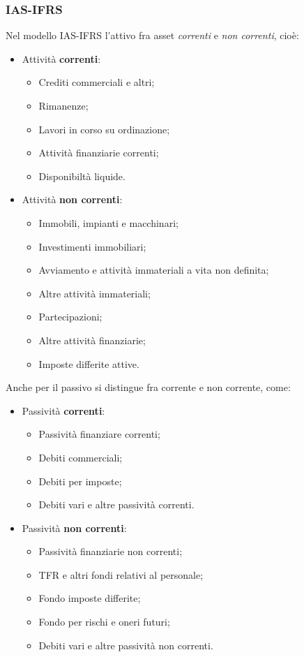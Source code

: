\documentclass[a4paper,11pt]{article}
\begin{document}
\subsubsection{IAS-IFRS}
Nel modello IAS-IFRS l'attivo fra asset \textit{correnti} e \textit{non correnti}, cioè:
\begin{itemize}
	\item Attività \textbf{correnti}:
		\begin{itemize}
			\item Crediti commerciali e altri;
			\item Rimanenze;
			\item Lavori in corso su ordinazione;
			\item Attività finanziarie correnti;
			\item Disponibiltà liquide.
		\end{itemize}
	\item Attività \textbf{non correnti}:
		\begin{itemize}
			\item Immobili, impianti e macchinari;
			\item Investimenti immobiliari;
			\item Avviamento e attività immateriali a vita non definita;
			\item Altre attività immateriali;
			\item Partecipazioni;
			\item Altre attività finanziarie;
			\item Imposte differite attive.
		\end{itemize}
\end{itemize}

Anche per il passivo si distingue fra corrente e non corrente, come:
\begin{itemize}
	\item Passività \textbf{correnti}:
		\begin{itemize}
			\item Passività finanziare correnti;
			\item Debiti commerciali;
			\item Debiti per imposte;
			\item Debiti vari e altre passività correnti.
		\end{itemize}
	\item Passività \textbf{non correnti}:
		\begin{itemize}
			\item Passività finanziarie non correnti;
			\item TFR e altri fondi relativi al personale;
			\item Fondo imposte differite;
			\item Fondo per rischi e oneri futuri;
			\item Debiti vari e altre passività non correnti.
		\end{itemize}
\end{itemize}
\end{document}
